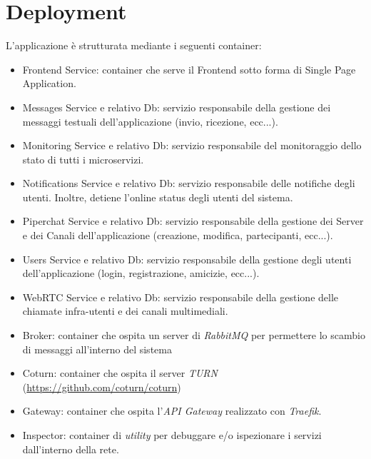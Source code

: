 \chapter{Deployment}

L'applicazione è strutturata mediante i seguenti container:

\begin{itemize}
    \item Frontend Service: container che serve il Frontend sotto forma di Single Page Application.

    \item Messages Service e relativo Db: servizio responsabile della gestione dei messaggi testuali dell'applicazione (invio, ricezione, ecc...).

    \item Monitoring Service e relativo Db: servizio responsabile del monitoraggio dello stato di tutti i microservizi.

    \item Notifications Service e relativo Db: servizio responsabile delle notifiche degli utenti. Inoltre, detiene l'online status degli utenti del sistema.

    \item Piperchat Service e relativo Db: servizio responsabile della gestione dei Server e dei Canali dell'applicazione (creazione, modifica, partecipanti, ecc...).

    \item Users Service e relativo Db: servizio responsabile della gestione degli utenti dell'applicazione (login, registrazione, amicizie, ecc...).

    \item WebRTC Service e relativo Db: servizio responsabile della gestione delle chiamate infra-utenti e dei canali multimediali.

    \item Broker: container che ospita un server di \emph{RabbitMQ} per permettere lo scambio di messaggi all'interno del sistema

    \item Coturn: container che ospita il server \emph{TURN} (\url{https://github.com/coturn/coturn})

    \item Gateway: container che ospita l'\emph{API Gateway} realizzato con \emph{Traefik}. 

    \item Inspector: container di \emph{utility} per debuggare e/o ispezionare i servizi dall'interno della rete.
\end{itemize}

